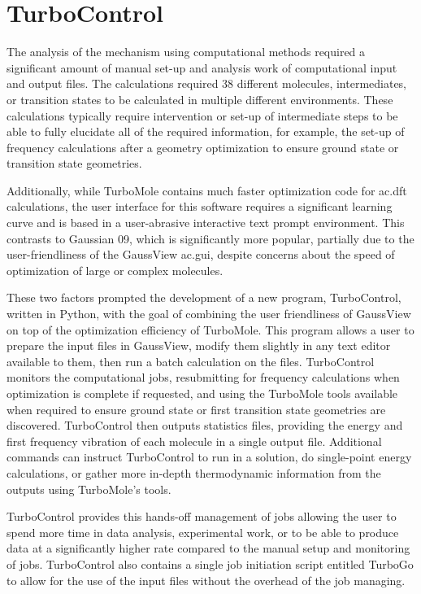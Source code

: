 \chapter{TurboControl}\label{chap.turbocontrol}

The analysis of the mechanism using computational methods required a significant amount of manual set-up and analysis work of computational input and output files. The calculations required 38 different molecules, intermediates, or transition states to be calculated in multiple different environments. These calculations typically require intervention or set-up of intermediate steps to be able to fully elucidate all of the required information, for example, the set-up of frequency calculations after a geometry optimization to ensure ground state or transition state geometries. 

Additionally, while TurboMole contains much faster optimization code for \gls{ac.dft} calculations, the user interface for this software requires a significant learning curve and is based in a user-abrasive interactive text prompt environment. This contrasts to Gaussian 09, which is significantly more popular, partially due to the user-friendliness of the GaussView \gls{ac.gui}, despite concerns about the speed of optimization of large or complex molecules.

These two factors prompted the development of a new program, TurboControl, written in Python, with the goal of combining the user friendliness of GaussView on top of the optimization efficiency of TurboMole. This program allows a user to prepare the input files in GaussView, modify them slightly in any text editor available to them, then run a batch calculation on the files. TurboControl monitors the computational jobs, resubmitting for frequency calculations when optimization is complete if requested, and using the TurboMole tools available when required to ensure ground state or first transition state geometries are discovered. TurboControl then outputs statistics files, providing the energy and first frequency vibration of each molecule in a single output file. Additional commands can instruct TurboControl to run in a solution, do single-point energy calculations, or gather more in-depth thermodynamic information from the outputs using TurboMole's tools. 

TurboControl provides this hands-off management of jobs allowing the user to spend more time in data analysis, experimental work, or to be able to produce data at a significantly higher rate compared to the manual setup and monitoring of jobs. TurboControl also contains a single job initiation script entitled TurboGo to allow for the use of the input files without the overhead of the job managing.

